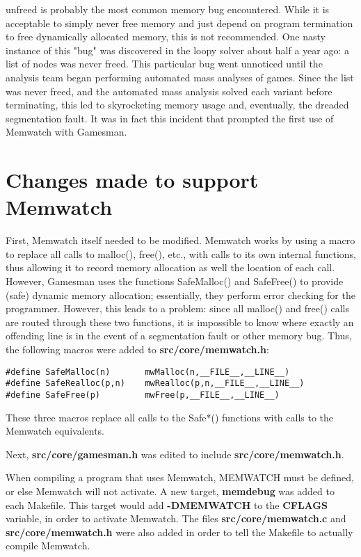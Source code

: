 \documentclass[11pt]{article}
\begin{document}
unfreed is probably the most common memory bug encountered. While it is acceptable to simply never free memory and just depend on program termination to free dynamically allocated memory, this is not recommended. One nasty instance of this "bug" was discovered in the loopy solver about half a year ago: a list of nodes was never freed. This particular bug went unnoticed until the analysis team began performing automated mass analyses of games. Since the list was never freed, and the automated mass analysis solved each variant before terminating, this led to skyrocketing memory usage and, eventually, the dreaded segmentation fault. It was in fact this incident that prompted the first use of Memwatch with Gamesman.

\section{Changes made to support Memwatch}
First, Memwatch itself needed to be modified. Memwatch works by using a macro to replace all calls to malloc(), free(), etc., with calls to its own internal functions, thus allowing it to record memory allocation as well the location of each call. However, Gamesman uses the functions SafeMalloc() and SafeFree() to provide (safe) dynamic memory allocation; essentially, they perform error checking for the programmer. However, this leads to a problem: since all malloc() and free() calls are routed through these two functions, it is impossible to know where exactly an offending line is in the event of a segmentation fault or other memory bug. Thus, the following macros were added to \textbf{src/core/memwatch.h}:
\begin{verbatim}
#define SafeMalloc(n)		mwMalloc(n,__FILE__,__LINE__)
#define SafeRealloc(p,n)	mwRealloc(p,n,__FILE__,__LINE__)
#define SafeFree(p)			mwFree(p,__FILE__,__LINE__)
\end{verbatim}

These three macros replace all calls to the Safe*() functions with calls to the Memwatch equivalents.

Next, \textbf{src/core/gamesman.h} was edited to include \textbf{src/core/memwatch.h}.

When compiling a program that uses Memwatch, MEMWATCH must be defined, or else Memwatch will not activate. A new target, \textbf{memdebug} was added to each Makefile. This target would add \textbf{-DMEMWATCH} to the \textbf{CFLAGS} variable, in order to activate Memwatch. The files \textbf{src/core/memwatch.c} and \textbf{src/core/memwatch.h} were also added in order to tell the Makefile to actually compile Memwatch.
\end{document}
